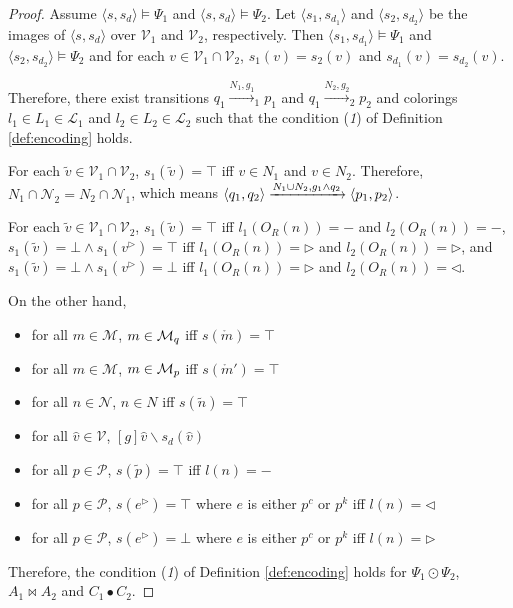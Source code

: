\noindent
\begin{proof}
Assume $\langle s, s_d \rangle \vDash \Psi_{1}$ and $\langle s, s_d \rangle \vDash \Psi_{2}$. Let $\langle s_{1}, s_{d_{1}} \rangle$ and  $\langle s_{2}, s_{d_{2}} \rangle$ be the images of $\langle s, s_d \rangle$ over $\mathcal{V}_{1}$ and $\mathcal{V}_{2}$, respectively. Then $\langle s_1, s_{d_1} \rangle \vDash \Psi_1$ and $\langle s_2, s_{d_2} \rangle \vDash \Psi_2$ and for each $v \in \mathcal{V}_1 \cap \mathcal{V}_2$, $s_1(v)=s_2(v)$ and $s_{d_1}(v)=s_{d_2}(v)$. 

\noindent
Therefore, there exist transitions $q_{1}{\xrightarrow{N_{1},g_{1}}_1}p_{1}$ and $q_{1}{\xrightarrow{N_{2},g_{2}}_2}p_{2}$ and colorings $l_{1} \in L_{1} \in \mathcal{L}_{1}$ and $l_{2} \in L_{2} \in \mathcal{L}_{2}$ such that the condition (\textit{1}) of Definition \ref{def:encoding} holds. 

\noindent
For each $\tilde{v} \in \mathcal{V}_1 \cap \mathcal{V}_2$, $s_1(\tilde{v})=\top$ iff $v \in N_1$ and $v \in N_2$. Therefore, $N_1 \cap \mathcal{N}_2 = N_2 \cap \mathcal{N}_1$, which means $\langle q_1,q_2\rangle\xrightarrow{N_1 \cup N_2,g_1\wedge q_2}\langle p_1,p_2\rangle$.

\noindent
For each $\tilde{v} \in \mathcal{V}_1 \cap \mathcal{V}_2$, $s_1(\tilde{v})=\top$ iff $l_1(\mathit{O}_R(n))=-$ and $l_2(\mathit{O}_R(n))=-$, $s_1(\tilde{v})=\bot \wedge s_1({v}^\triangleright)=\top$ iff $l _1(\mathit{O}_R(n))=\triangleright$ and $l_2(\mathit{O}_R(n))=\triangleright$, and $s_1(\tilde{v})=\bot \wedge s_1({v}^\triangleright)=\bot$ iff $l_1(\mathit{O}_R(n))=\triangleright$ and $l_2(\mathit{O}_R(n))=\triangleleft$. 

\noindent
On the other hand,   

   \begin{itemize}
   \item for all $m \in \mathcal{M}$, $m \in {\cal M}_q$ iff $s(\mathring{m})=\top$ 
   \item for all $m \in \mathcal{M}$, $m \in {\cal M}_p$ iff $s(\mathring{m}')=\top$
   \item for all $n \in \mathcal{N}$, $n \in N$ iff $s(\tilde{n})=\top$
   \item for all $\hat{v} \in \mathcal{V}$, $\left[g\right]\hat{v} \backslash s_d(\hat{v})$
   \item for all $p \in \mathcal{P}$, $s(\tilde{p})=\top$ iff $l(n) = -$ 
   \item for all $p \in \mathcal{P}$, $s({e}^\triangleright)=\top$ where $e$ is either $p^c$ or $p^k$  iff $l(n) = \triangleleft$
   \item for all $p \in \mathcal{P}$, $s({e}^\triangleright)=\bot$ where $e$ is either $p^c$ or $p^k$  iff $l(n) = \triangleright$
   \end{itemize}

Therefore, the condition (\textit{1}) of Definition \ref{def:encoding} holds for $\Psi_1 \odot \Psi_2$, $A_1 \bowtie A_2$ and $C_1 \bullet C_2$. 
\end{proof}

